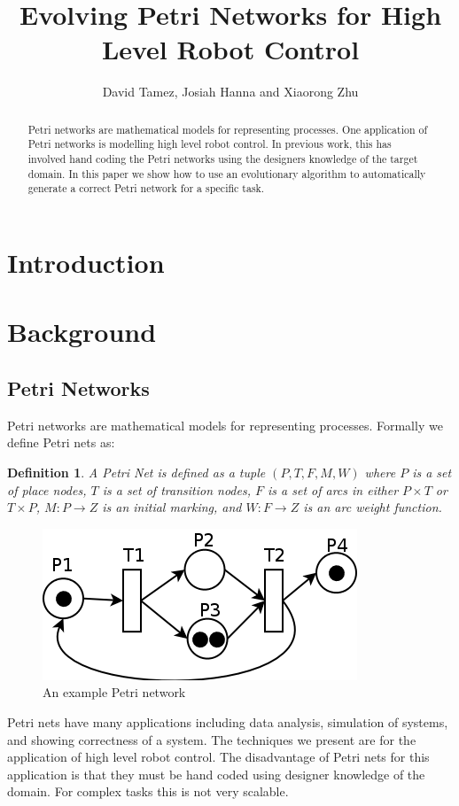 \documentclass[12pt,a4paper,twocolumn]{article}
\author{David Tamez, Josiah Hanna and Xiaorong Zhu}
\title{Evolving Petri Networks for High Level Robot Control}
\newtheorem{myDef}{Definition}
\begin{document}
\maketitle

\begin{abstract}

Petri networks are mathematical models for representing processes. One application of Petri networks is modelling high level robot control. In previous work, this has involved hand coding the Petri networks using the designers knowledge of the target domain. In this paper we show how to use an evolutionary algorithm to automatically generate a correct Petri network for a specific task. 

\end{abstract}

\section{Introduction}

\section{Background}

\subsection{Petri Networks}
Petri networks are mathematical models for representing processes. Formally we define Petri nets as:
\begin{myDef}
A Petri Net is defined as a tuple $(P,T,F,M,W)$ where $P$ is a set of place nodes, $T$ is a set of transition nodes, $F$ is a set of arcs in either $P \times T$ or $T \times P$, $M: P \rightarrow Z$ is an initial marking, and $W: F \rightarrow Z$ is an arc weight function.
\end{myDef}
\begin{figure}[h]
\centering
\includegraphics[scale=0.25]{petri_net.png}
\caption[]{An example Petri network \label{exampleNet}}
\end{figure}
Petri nets have many applications including data analysis, simulation of systems, and showing correctness of a system. The techniques we present are for the application of high level robot control. The disadvantage of Petri nets for this application is that they must be hand coded using designer knowledge of the domain. For complex tasks this is not very scalable.
\end{document}
